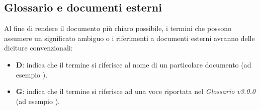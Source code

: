 \subsection{Glossario e documenti esterni}\label{GlossarioDocumentiEsterni}
Al fine di rendere il documento più chiaro possibile, i termini che possono assumere un significato ambiguo o i riferimenti a documenti esterni
avranno delle diciture convenzionali:

\begin{itemize}
    \item \textbf{D}: indica che il termine si riferisce al nome di un particolare documento (ad esempio \PdPd).
    \item \textbf{G}: indica che il termine si riferisce ad una voce riportata nel \textit{Glossario v3.0.0} (ad esempio ).
\end{itemize}
